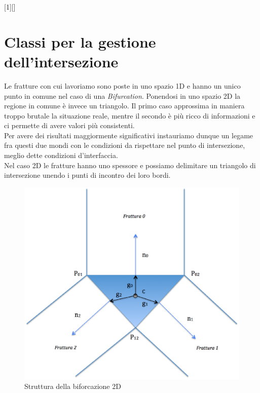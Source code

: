 [1][]{}{}

\chapter{Classi per la gestione dell'intersezione}

Le fratture con cui lavoriamo sono poste in uno spazio 1D e hanno un unico punto in comune nel caso di una \textit{Bifurcation}. Ponendosi in uno spazio 2D la regione in comune è invece un triangolo. Il primo caso approssima in maniera troppo brutale la situazione reale, mentre il secondo \`{e} pi\`{u} ricco di informazioni e ci permette di avere valori pi\`{u} consistenti.\\
Per avere dei risultati maggiormente significativi instauriamo dunque un legame fra questi due mondi con le condizioni da rispettare nel punto di intersezione, meglio dette condizioni d'interfaccia.\\
Nel caso 2D le fratture hanno uno spessore e possiamo delimitare un triangolo di intersezione unendo i punti di incontro dei loro bordi. \\
\begin{figure}[htbp]
\includegraphics[width=1\textwidth]{img/TriangoloBiforcazione.eps}
\caption{Struttura della biforcazione 2D}\label{Biforcazione}
\end{figure}

